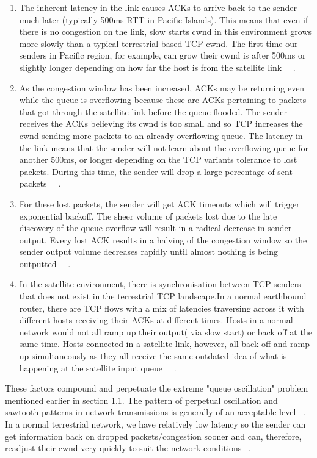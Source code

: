 \begin{enumerate}
\item The inherent latency in the link causes ACKs to arrive back to the sender much later (typically 500ms RTT in Pacific Islands). This means that even if there is no congestion on the link, slow starts cwnd in this environment grows more slowly than a typical terrestrial based TCP cwnd. The first time our senders in Pacific region, for example, can grow their cwnd is after 500ms or slightly longer depending on how far the host is from the satellite link ~\cite{4}~\cite{8}. \\
\item As the congestion window has been increased, ACKs may be returning even while the queue is overflowing because these are ACKs pertaining to packets that got through the satellite link before the queue flooded. The sender receives the ACKs believing its cwnd is too small and so TCP increases the cwnd sending more packets to an already overflowing queue. The latency in the link means that the sender will not learn about the overflowing queue for another 500ms, or longer depending on the TCP variants tolerance to lost packets. During this time, the sender will drop a large percentage of sent packets ~\cite{4}~\cite{8}.\\
\item For these lost packets, the sender will get ACK timeouts which will trigger exponential backoff. The sheer volume of packets lost due to the late discovery of the queue overflow will result in a radical decrease in sender output. Every lost ACK results in a halving of the congestion window so the sender output volume decreases rapidly until almost nothing is being outputted ~\cite{4}~\cite{8}.\\
\item  In the satellite environment, there is synchronisation between TCP senders that does not exist in the terrestrial TCP landscape.In a normal earthbound router, there are TCP flows with a mix of latencies traversing across it with different hosts receiving their ACKs at different times. Hosts in a normal network would not all ramp up their output( via slow start) or  back off at the same time. Hosts connected in a satellite link, however, all back off and ramp up simultaneously as they all receive the same outdated idea of what is happening at the satellite input queue ~\cite{4}~\cite{8}.\\
\end{enumerate}

These factors compound and perpetuate the extreme "queue oscillation" problem mentioned earlier in section 1.1. The pattern of perpetual oscillation and sawtooth patterns in network transmissions is generally of an acceptable level ~\cite{5}. In a normal terrestrial network, we have relatively low latency so the sender can get information back on dropped packets/congestion sooner and can, therefore, readjust their cwnd very quickly to suit the network conditions ~\cite{1}.\\

